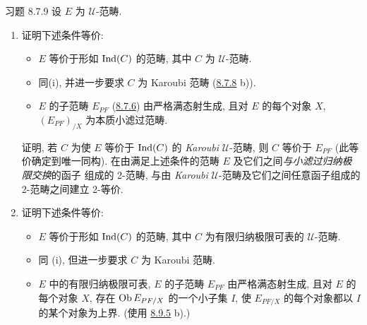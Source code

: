 \begin{enonce*}[remark]{习题 8.7.9}
设 $E$ 为 $𝒰$-范畴.
\begin{enumerate}
\renewcommand{\theenumi}{\alph{enumi}}
\renewcommand{\labelenumi}{\theenumi)}
\item 证明下述条件等价:

\begin{itemize}
\item[(i)] $E$ 等价于形如 $\operatorname{Ind}(C)$ 的范畴, 其中 $C$ 为 $𝒰$-范畴.

\item[(i bis)] 同\pageoriginale (i), 并进一步要求 $C$ 为 Karoubi 范畴
(\hyperref[I.exer8.7.8]{8.7.8} b)).

\item[(ii)] $E$ 的子范畴 $E_{PF}$ (\hyperref[I.cor8.7.6]{8.7.6})
由严格满态射生成, 且对 $E$ 的每个对象 $X$,
$(E_{PF})_{/X}$ 为本质小滤过范畴.
\end{itemize}

证明, 若 $C$ 为使 $E$ 等价于 $\operatorname{Ind}(C)$ 的 \emph{Karoubi} $𝒰$-范畴,
则 $C$ 等价于 $E_{PF}$ (此等价确定到唯一同构).
在由满足上述条件的范畴 $E$ 及它们之间\emph{与小滤过归纳极限交换}的函子
组成的 2-范畴, 与由 \emph{Karoubi} $𝒰$-范畴及它们之间任意函子组成的
2-范畴之间建立 2-等价.

\item 证明下述条件等价:

\begin{itemize}
\item[(i)] $E$ 等价于形如 $\operatorname{Ind}(C)$ 的范畴,
其中 $C$ 为有限归纳极限可表的 $𝒰$-范畴.

\item[(i bis)] 同 (i), 但进一步要求 $C$ 为 Karoubi 范畴.

\item[(ii)] $E$ 中的有限归纳极限可表, $E$ 的子范畴 $E_{PF}$ 由严格满态射生成,
且对 $E$ 的每个对象 $X$, 存在 $\operatorname{Ob} E_{PF/X}$ 的一个小子集 $I$,
使 $E_{PF/X}$ 的每个对象都以 $I$ 的某个对象为上界.
(使用 \hyperref[I.prop8.9.5]{8.9.5} b).)
\end{itemize}
\end{enumerate}
\end{enonce*}




